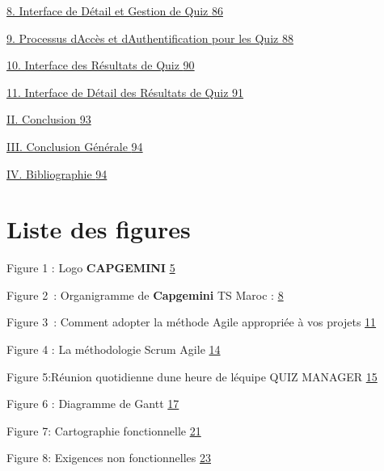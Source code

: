 \documentclass[12pt,a4paper,twoside]{report}
\begin{document}
\protect\hyperlink{interface-de-duxe9tail-et-gestion-de-quiz}{8.
Interface de Détail et Gestion de Quiz
\protect\hyperlink{interface-de-duxe9tail-et-gestion-de-quiz}{86}}

\protect\hyperlink{processus-daccuxe8s-et-dauthentification-pour-les-quiz}{9.
Processus d\textquotesingle Accès et d\textquotesingle Authentification
pour les Quiz
\protect\hyperlink{processus-daccuxe8s-et-dauthentification-pour-les-quiz}{88}}

\protect\hyperlink{interface-des-ruxe9sultats-de-quiz}{10. Interface des
Résultats de Quiz
\protect\hyperlink{interface-des-ruxe9sultats-de-quiz}{90}}

\protect\hyperlink{interface-de-duxe9tail-des-ruxe9sultats-de-quiz}{11.
Interface de Détail des Résultats de Quiz
\protect\hyperlink{interface-de-duxe9tail-des-ruxe9sultats-de-quiz}{91}}

\protect\hyperlink{conclusion-4}{II. Conclusion
\protect\hyperlink{conclusion-4}{93}}

\protect\hyperlink{conclusion-guxe9nuxe9rale-1}{III. Conclusion Générale
\protect\hyperlink{conclusion-guxe9nuxe9rale-1}{94}}

\protect\hyperlink{bibliographie}{IV. Bibliographie
\protect\hyperlink{bibliographie}{94}}

\hypertarget{liste-des-figures}{%
\section{\texorpdfstring{Liste des figures
}{Liste des figures }}\label{liste-des-figures}}

Figure 1 : Logo \textbf{CAPGEMINI} \protect\hyperlink{_Toc203823413}{5}

Figure 2~: Organigramme de \textbf{Capgemini} TS Maroc :
\protect\hyperlink{_Toc203823414}{8}

Figure 3~: Comment adopter la méthode Agile appropriée à vos projets
\protect\hyperlink{_Toc203823415}{11}

Figure 4 : La méthodologie Scrum Agile
\protect\hyperlink{_Toc203823416}{14}

Figure 5:Réunion quotidienne d\textquotesingle une heure de
l\textquotesingle équipe QUIZ MANAGER
\protect\hyperlink{_Toc203823417}{15}

Figure 6 : Diagramme de Gantt \protect\hyperlink{_Toc203823418}{17}

Figure 7: Cartographie fonctionnelle
\protect\hyperlink{_Toc203823419}{21}

Figure 8: Exigences non fonctionnelles
\protect\hyperlink{_Toc203823420}{23}
\end{document}
